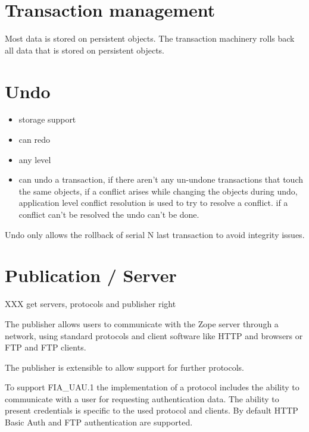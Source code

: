 \documentclass[12pt,english]{scrbook}
\begin{document}
\section{Transaction management}

Most data is stored on persistent objects. The transaction machinery rolls back
all data that is stored on persistent objects.





\section{Undo}
\begin{itemize}
\item {} 
storage support

\item {} 
can redo

\item {} 
any level

\item {} 
can undo a transaction, if there aren't any un-undone transactions that touch
the same objects, if a conflict arises while changing the objects during
undo, application level conflict resolution is used to try to resolve a
conflict. if a conflict can't be resolved the undo can't be done.

\end{itemize}

Undo only allows the rollback of serial N last transaction to avoid integrity issues.





\section{Publication / Server}

XXX get servers, protocols and publisher right

The publisher allows users to communicate with the Zope server through a
network, using standard protocols and client software like HTTP and browsers or
FTP and FTP clients.

The publisher is extensible to allow support for further protocols.

To support FIA{\_}UAU.1 the implementation of a protocol includes the ability to
communicate with a user for requesting authentication data. The ability to
present credentials is specific to the used protocol and clients. By default
HTTP Basic Auth and FTP authentication are supported.
\end{document}

